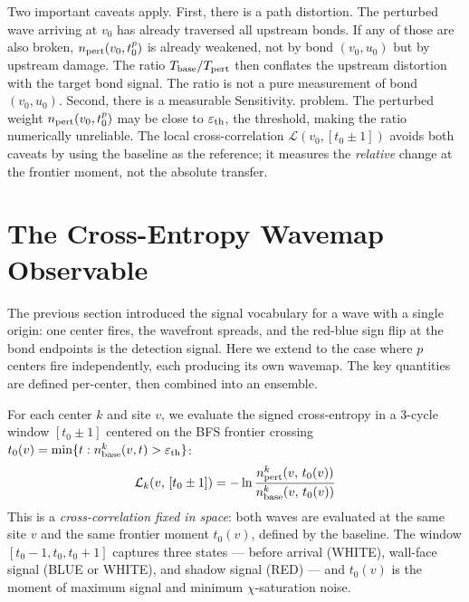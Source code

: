 \documentclass[11pt]{article}
\begin{document}
Two important caveats apply. First, there is a path distortion. The
perturbed wave arriving at $v_0$ has already traversed all upstream
bonds. If any of those are also broken, $n_{\rm pert}(v_0, t_0^p)$ is
already weakened, not by bond $(v_0, u_0)$ but by upstream damage.
The ratio $T_{\rm base}/T_{\rm pert}$ then conflates the upstream
distortion with the target bond signal. The ratio is not a pure
measurement of bond $(v_0, u_0)$. Second, there is a measurable
Sensitivity. problem. The perturbed weight $n_{\rm pert}(v_0, t_0^p)$
may be close to $\varepsilon_{\rm th}$, the threshold, making the
ratio numerically unreliable.  The local cross-correlation
$\mathcal{L}(v_0, [t_0 \pm 1])$ avoids both caveats by using the
baseline as the reference; it measures the \emph{relative} change at
the frontier moment, not the absolute transfer.

\section{The Cross-Entropy Wavemap Observable}

The previous section introduced the signal vocabulary for a wave with a single
origin: one center fires, the wavefront spreads, and the red-blue sign flip
at the bond endpoints is the detection signal. Here we extend to the case
where $p$ centers fire independently, each producing its own wavemap. The key
quantities are defined per-center, then combined into an ensemble.

For each center $k$ and site $v$, we evaluate the signed cross-entropy in a
3-cycle window $[t_0 \pm 1]$ centered on the BFS frontier crossing
$t_0(v) = \min\{t : n^k_{\rm base}(v,t) > \varepsilon_{\rm th}\}$:
\begin{equation}
    \mathcal{L}_k(v,\, [t_0 \pm 1]) = -\ln \frac{n^k_{\rm pert}(v,\, t_0(v))}
                                                  {n^k_{\rm base}(v,\, t_0(v))}
\end{equation}
This is a \emph{cross-correlation fixed in space}: both waves are evaluated
at the same site $v$ and the same frontier moment $t_0(v)$, defined by the
baseline. The window $[t_0-1, t_0, t_0+1]$ captures three states ---
before arrival (WHITE), wall-face signal (BLUE or WHITE), and shadow signal (RED) ---
and $t_0(v)$ is the moment of maximum signal and minimum $\chi$-saturation noise.
\end{document}
